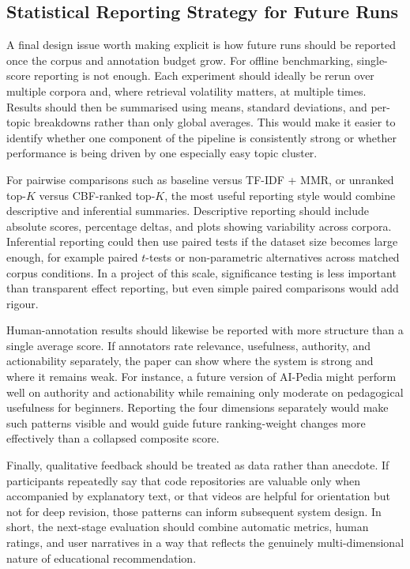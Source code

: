 \documentclass[10pt,journal,compsoc]{IEEEtran}
\begin{document}
\subsection{Statistical Reporting Strategy for Future Runs}

A final design issue worth making explicit is how future runs should be reported once the corpus and annotation budget grow. For offline benchmarking, single-score reporting is not enough. Each experiment should ideally be rerun over multiple corpora and, where retrieval volatility matters, at multiple times. Results should then be summarised using means, standard deviations, and per-topic breakdowns rather than only global averages. This would make it easier to identify whether one component of the pipeline is consistently strong or whether performance is being driven by one especially easy topic cluster.

For pairwise comparisons such as baseline versus TF-IDF + MMR, or unranked top-$K$ versus CBF-ranked top-$K$, the most useful reporting style would combine descriptive and inferential summaries. Descriptive reporting should include absolute scores, percentage deltas, and plots showing variability across corpora. Inferential reporting could then use paired tests if the dataset size becomes large enough, for example paired $t$-tests or non-parametric alternatives across matched corpus conditions. In a project of this scale, significance testing is less important than transparent effect reporting, but even simple paired comparisons would add rigour.

Human-annotation results should likewise be reported with more structure than a single average score. If annotators rate relevance, usefulness, authority, and actionability separately, the paper can show where the system is strong and where it remains weak. For instance, a future version of AI-Pedia might perform well on authority and actionability while remaining only moderate on pedagogical usefulness for beginners. Reporting the four dimensions separately would make such patterns visible and would guide future ranking-weight changes more effectively than a collapsed composite score.

Finally, qualitative feedback should be treated as data rather than anecdote. If participants repeatedly say that code repositories are valuable only when accompanied by explanatory text, or that videos are helpful for orientation but not for deep revision, those patterns can inform subsequent system design. In short, the next-stage evaluation should combine automatic metrics, human ratings, and user narratives in a way that reflects the genuinely multi-dimensional nature of educational recommendation.
\end{document}
